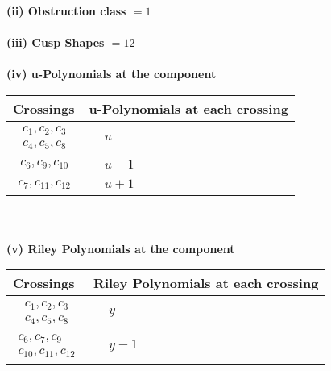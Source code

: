 \documentclass[1p]{elsarticle_modified}
\theoremstyle{definition}
\begin{document}
\flushleft \textbf{(ii) Obstruction class $= 1$}\\~\\
\flushleft \textbf{(iii) Cusp Shapes $= 12$}\\~\\
\newpage\renewcommand{\arraystretch}{1}
\flushleft \textbf{(iv) u-Polynomials at the component}\newline \\
\begin{tabular}{m{50pt}|m{274pt}}
Crossings & \hspace{64pt}u-Polynomials at each crossing \\
\hline $$\begin{aligned}c_{1},c_{2},c_{3}\\c_{4},c_{5},c_{8}\end{aligned}$$&$\begin{aligned}
&u
\end{aligned}$\\
\hline $$\begin{aligned}c_{6},c_{9},c_{10}\end{aligned}$$&$\begin{aligned}
&u-1
\end{aligned}$\\
\hline $$\begin{aligned}c_{7},c_{11},c_{12}\end{aligned}$$&$\begin{aligned}
&u+1
\end{aligned}$\\
\hline
\end{tabular}\\~\\
\newpage\renewcommand{\arraystretch}{1}
\flushleft \textbf{(v) Riley Polynomials at the component}\newline \\
\begin{tabular}{m{50pt}|m{274pt}}
Crossings & \hspace{64pt}Riley Polynomials at each crossing \\
\hline $$\begin{aligned}c_{1},c_{2},c_{3}\\c_{4},c_{5},c_{8}\end{aligned}$$&$\begin{aligned}
&y
\end{aligned}$\\
\hline $$\begin{aligned}c_{6},c_{7},c_{9}\\c_{10},c_{11},c_{12}\end{aligned}$$&$\begin{aligned}
&y-1
\end{aligned}$\\
\hline
\end{tabular}\\~\\
\end{document}
